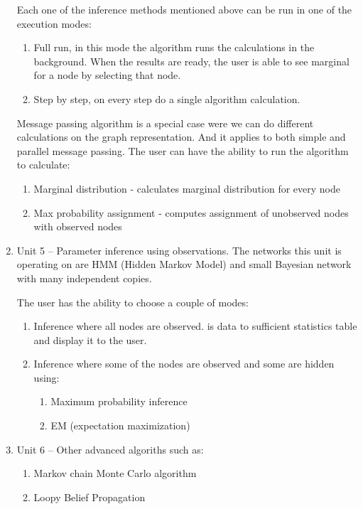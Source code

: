\documentclass{article}
\newcommand{\comment}[2]{
	\todo[color=GreenYellow,inline]{
		\underline{\textbf{#1:}} #2
	}}
\begin{document}
\begin{enumerate}
            Each one of the inference methods mentioned above can be run in one of the execution modes:
            \begin{enumerate}
                \item Full run, in this mode the algorithm runs the calculations in the background. When the results are ready, the user is able to see marginal for a node by selecting that node.
                \item Step by step, on every step do a single algorithm calculation.
            \end{enumerate}

            Message passing algorithm is a special case were we can do different calculations on the graph representation. And it applies to both simple and parallel message passing. The user can have the ability to run the algorithm to calculate:
            \begin{enumerate}
                \item Marginal distribution - calculates marginal distribution for every node
                \item Max probability assignment - computes assignment of unobserved nodes with observed nodes 
            \end{enumerate}

        \item Unit 5 --
            Parameter inference using observations. The networks this unit is operating on are HMM (Hidden Markov Model) and small Bayesian network with many independent copies.

            The user has the ability to choose a couple of modes:
            \begin{enumerate}
                \item Inference where all nodes are observed. is data to sufficient statistics table and display it to the user.
                \item Inference where some of the nodes are observed and some are hidden using:
                \begin{enumerate}
                    \item Maximum probability inference
                    \item EM (expectation maximization) 
                \end{enumerate}
            \end{enumerate}
        \item Unit 6 --
            Other advanced algoriths such as:
        \begin{enumerate}
            \item Markov chain Monte Carlo algorithm
            \item Loopy Belief Propagation 
        \end{enumerate}
    \end{enumerate}
\end{document}
